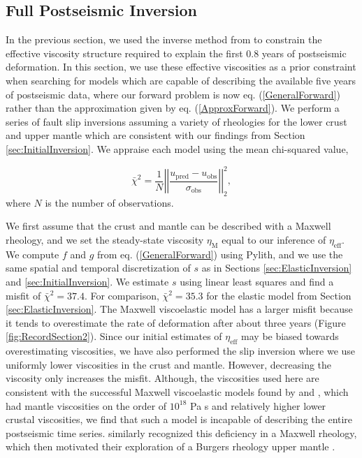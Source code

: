 \documentclass[draft,linenumbers]{AGUJournal}
\begin{document}
\subsection{Full Postseismic Inversion}\label{sec:FullInversion} 

In the previous section, we used the inverse method from \citet{Hines2016} to constrain the effective viscosity structure required to explain the first 0.8 years of postseismic deformation. In this section, we use these effective viscosities as a prior constraint when searching for models which are capable of describing the available five years of postseismic data, where our forward problem is now eq. (\ref{GeneralForward}) rather than the approximation given by eq. (\ref{ApproxForward}).  We perform a series of fault slip inversions assuming a variety of rheologies for the lower crust and upper mantle which are consistent with our findings from Section \ref{sec:InitialInversion}.  We appraise each model using the mean chi-squared value,

\begin{equation}\label{eq:Misfit}
  \bar\chi^2 = \frac{1}{N}\left|\left|\frac{u_\mathrm{pred} - u_\mathrm{obs}}{\sigma_\mathrm{obs}}\right|\right|_2^2,
\end{equation}
where $N$ is the number of observations.

We first assume that the crust and mantle can be described with a Maxwell rheology, and we set the steady-state viscosity $\eta_\mathrm{M}$ equal to our inference of $\eta_{\mathrm{eff}}$.  We compute $f$ and $g$ from eq. (\ref{GeneralForward}) using Pylith, and we use the same spatial and temporal discretization of $s$ as in Sections \ref{sec:ElasticInversion} and \ref{sec:InitialInversion}. We estimate $s$ using linear least squares and find a misfit of $\bar\chi^2=37.4$. For comparison, $\bar\chi^2=35.3$ for the elastic model from Section \ref{sec:ElasticInversion}.  The Maxwell viscoelastic model has a larger misfit because it tends to overestimate the rate of deformation after about three years (Figure \ref{fig:RecordSection2}). Since our initial estimates of $\eta_\mathrm{eff}$ may be biased towards overestimating viscosities, we have also performed the slip inversion where we use uniformly lower viscosities in the crust and mantle. However, decreasing the viscosity only increases the misfit.  Although, the viscosities used here are consistent with the successful Maxwell viscoelastic models found by \citet{Rollins2015} and \citet{Spinler2015}, which had mantle viscosities on the order of $10^{18}$ Pa s and relatively higher lower crustal viscosities, we find that such a model is incapable of describing the entire postseismic time series.  \citet{Pollitz2001} similarly recognized this deficiency in a Maxwell rheology, which then motivated their exploration of a Burgers rheology upper mantle \citep{Pollitz2003}.  
\end{document}
